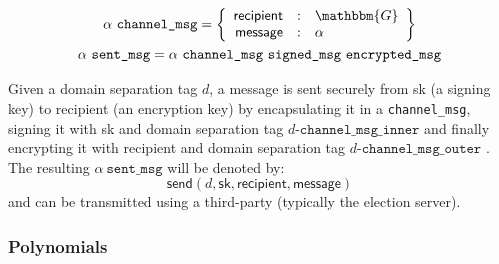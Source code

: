 \documentclass[a4paper]{article}
\newcommand{\G}{\mathbbm{G}}
\begin{document}
\begin{gather*}
  \alpha\ \texttt{channel\_msg}=\left\{
    \begin{array}{rcl}
      \textsf{recipient}&:&\G\\
      \textsf{message}&:&\alpha
    \end{array}
  \right\}\\
  \alpha\ \texttt{sent\_msg}=
  \alpha\ \texttt{channel\_msg}\ \texttt{signed\_msg}\ \texttt{encrypted\_msg}
\end{gather*}

Given a domain separation tag $d$, a \textsf{message} is sent securely
from \textsf{sk} (a signing key) to \textsf{recipient} (an encryption
key) by encapsulating it in a \texttt{channel\_msg}, signing it with
\textsf{sk} and domain separation tag $d\texttt{-channel\_msg\_inner}$
and finally encrypting it with \textsf{recipient} and domain
separation tag $d\texttt{-channel\_msg\_outer}$ . The resulting
$\alpha\ \texttt{sent\_msg}$ will be denoted by:
\[\textsf{send}(d,\textsf{sk},\textsf{recipient},\textsf{message})\]
and can be transmitted using a third-party (typically the election
server).

\subsubsection{Polynomials}
\label{polynomials}
\end{document}

